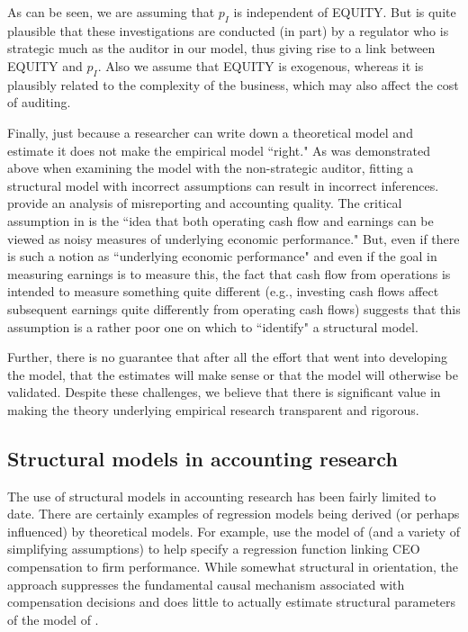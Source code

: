 As can be seen, we are assuming that $p_I$ is independent of EQUITY. 
But is quite plausible that these investigations are conducted (in part) by a regulator who is strategic much as the auditor in our model, thus giving rise to a link between EQUITY and $p_I$.
Also we assume that EQUITY is exogenous, whereas it is plausibly related to the complexity of the business, which may also affect the cost of auditing.

Finally, just because a researcher can write down a theoretical model and estimate it does not make the empirical model ``right."
As was demonstrated above when examining the model with the non-strategic auditor, fitting a structural model with incorrect assumptions can result in incorrect inferences.
 \cite{Nikolaev:2014er} provide an analysis of misreporting and accounting quality.
 The critical assumption in \citet[p.\,6]{Nikolaev:2014er} is the ``idea that both operating cash flow and earnings can be viewed as noisy measures of underlying economic performance."
But, even if there is such a notion as ``underlying economic performance" and even if the goal in measuring earnings is to measure this, the fact that cash flow from operations is intended to measure something quite different (e.g., investing cash flows affect subsequent earnings quite differently from operating cash flows) suggests that this assumption is a rather poor one on which to ``identify" a structural model.

Further, there is no guarantee that after all the effort that went into developing the model, that the estimates will make sense or that the model will otherwise be validated.
Despite these challenges, we believe that there is significant value in making the theory underlying empirical research transparent and rigorous.

\subsection{Structural models in accounting research}
The use of structural models in accounting research has been fairly limited to date.
There are certainly examples of regression models being derived (or perhaps influenced) by theoretical models.
For example, \citet{Lambert:1987} use the model of \citet{Holmstrom:1979aa} (and a variety of simplifying assumptions) to help specify a regression function linking CEO compensation to firm performance.
While somewhat structural in orientation, the approach suppresses the fundamental causal mechanism associated with compensation decisions and does little to actually estimate structural parameters of the model of \citet{Holmstrom:1979aa}.

